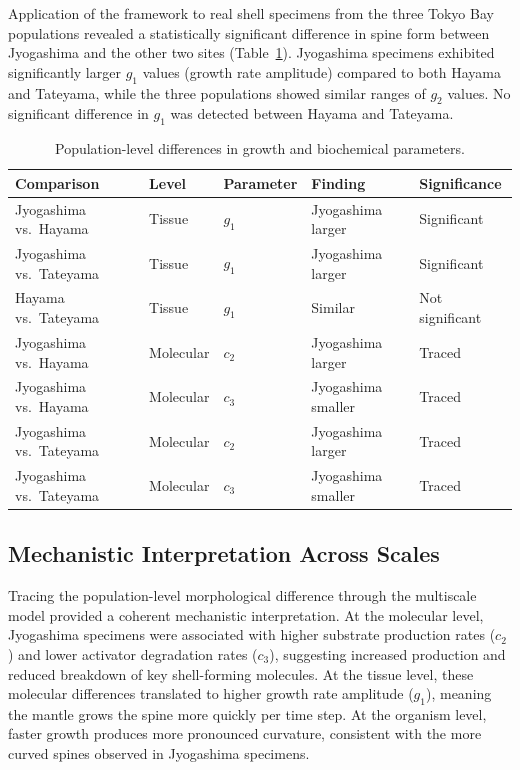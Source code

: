 \documentclass[11pt]{article}
\begin{document}
Application of the framework to real shell specimens from the three Tokyo Bay populations revealed a statistically significant difference in spine form between Jyogashima and the other two sites (Table~\ref{tab:population}). Jyogashima specimens exhibited significantly larger $g_1$ values (growth rate amplitude) compared to both Hayama and Tateyama, while the three populations showed similar ranges of $g_2$ values. No significant difference in $g_1$ was detected between Hayama and Tateyama.

\begin{table}[htbp]
\centering
\caption{Population-level differences in growth and biochemical parameters.}
\label{tab:population}
\begin{tabular}{lllll}
\toprule
\textbf{Comparison} & \textbf{Level} & \textbf{Parameter} & \textbf{Finding} & \textbf{Significance} \\
\midrule
Jyogashima vs.\ Hayama & Tissue & $g_1$ & Jyogashima larger & Significant \\
Jyogashima vs.\ Tateyama & Tissue & $g_1$ & Jyogashima larger & Significant \\
Hayama vs.\ Tateyama & Tissue & $g_1$ & Similar & Not significant \\
Jyogashima vs.\ Hayama & Molecular & $c_2$ & Jyogashima larger & Traced \\
Jyogashima vs.\ Hayama & Molecular & $c_3$ & Jyogashima smaller & Traced \\
Jyogashima vs.\ Tateyama & Molecular & $c_2$ & Jyogashima larger & Traced \\
Jyogashima vs.\ Tateyama & Molecular & $c_3$ & Jyogashima smaller & Traced \\
\bottomrule
\end{tabular}
\end{table}

\subsection{Mechanistic Interpretation Across Scales}

Tracing the population-level morphological difference through the multiscale model provided a coherent mechanistic interpretation. At the molecular level, Jyogashima specimens were associated with higher substrate production rates ($c_2$) and lower activator degradation rates ($c_3$), suggesting increased production and reduced breakdown of key shell-forming molecules. At the tissue level, these molecular differences translated to higher growth rate amplitude ($g_1$), meaning the mantle grows the spine more quickly per time step. At the organism level, faster growth produces more pronounced curvature, consistent with the more curved spines observed in Jyogashima specimens.
\end{document}
